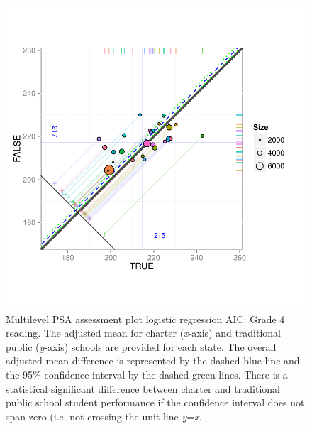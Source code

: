 \begin{figure}[h!]
\begin{center}
\includegraphics[width=\textwidth,trim=0 .6in 0 .6in]{../Figures2009/g4read-mlpsa-lrAIC-circ.pdf}
\caption[Multilevel PSA assessment plot logistic regression AIC: Grade 4 reading]{Multilevel PSA assessment plot logistic regression AIC: Grade 4 reading. The adjusted mean for charter (\textit{x}-axis) and traditional public (\textit{y}-axis) schools are provided for each state. The overall adjusted mean difference is represented by the dashed blue line and the 95\% confidence interval by the dashed green lines. There is a statistical significant difference between charter and traditional public school student performance if the confidence interval does not span zero (i.e. not crossing the unit line \textit{y}=\textit{x}.}
\end{center}
\end{figure}

